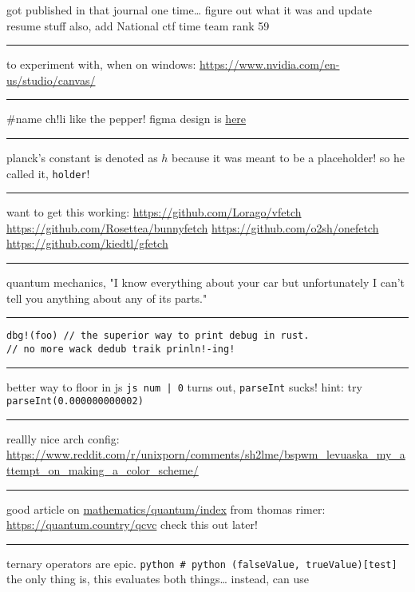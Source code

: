 \documentclass[letterpaper]{article}
\begin{document}
got published in that journal one time\ldots{} figure out what it was and
update resume stuff also, add National ctf time team rank 59

\noindent\rule{\textwidth}{0.5pt}

to experiment with, when on windows:
\url{https://www.nvidia.com/en-us/studio/canvas/}

\noindent\rule{\textwidth}{0.5pt}

\#name ch!li like the pepper! figma design is
\href{https://www.figma.com/file/Z3qcCiUBVYOY8MZwlc6yS1/ch!li?node-id=0\%3A1}{here}

\noindent\rule{\textwidth}{0.5pt}

planck's constant is denoted as \(h\) because it was meant to be a
placeholder! so he called it, \texttt{holder}!

\noindent\rule{\textwidth}{0.5pt}

want to get this working: \url{https://github.com/Lorago/vfetch}
\url{https://github.com/Rosettea/bunnyfetch} \url{https://github.com/o2sh/onefetch}
\url{https://github.com/kiedtl/gfetch}

\noindent\rule{\textwidth}{0.5pt}

quantum mechanics, "I know everything about your car but unfortunately I
can't tell you anything about any of its parts."

\noindent\rule{\textwidth}{0.5pt}

\begin{verbatim}
dbg!(foo) // the superior way to print debug in rust.
// no more wack dedub traik prinln!-ing!
\end{verbatim}

\noindent\rule{\textwidth}{0.5pt}

better way to floor in js \texttt{js num | 0} turns out, \texttt{parseInt} sucks!
hint: try \texttt{parseInt(0.000000000002)}

\noindent\rule{\textwidth}{0.5pt}

reallly nice arch config:
\url{https://www.reddit.com/r/unixporn/comments/sh2lme/bspwm\_levuaska\_my\_attempt\_on\_making\_a\_color\_scheme/}

\noindent\rule{\textwidth}{0.5pt}

good article on
\href{mathematics/quantum/index.org}{mathematics/quantum/index} from
thomas rimer: \url{https://quantum.country/qcvc} check this out later!

\noindent\rule{\textwidth}{0.5pt}

ternary operators are epic.
\texttt{python \# python (falseValue, trueValue)[test]} the only thing is, this
evaluates both things\ldots{} instead, can use
\end{document}
